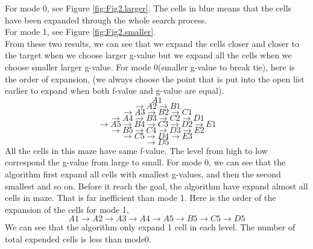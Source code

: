 \documentclass[11pt]{article}
\begin{document}
\newline 
For mode 0, see Figure \ref{fig:Fig2.larger}.
The cells in blue means that the cells have been expanded through the whole search process.\\ 
For mode 1, see Figure \ref{fig:Fig2.smaller}.\\
From these two results, we can see that we expand the cells closer and closer to the target when we choose larger g-value but we expand all the cells when we choose smaller larger g-value. 
\newline 
For mode 0(smaller g-value to break tie), here is the order of expansion,
\newline(we always choose the point that is put into the open list earlier to expand when both f-value and g-value are equal).
$$A1$$
$$\to A2\to B1$$
$$\to A3\to B2\to C1$$
$$\to A4\to B3\to C2\to D1$$
$$\to A5\to B4\to C3\to D2\to E1$$
$$\to B5\to C4\to D3\to E2$$
$$\to C5\to D4\to E3$$
$$\to D5$$
All the cells in this maze have same f-value. The level from high to low correspond the g-value from large to small.
\newline
For mode 0, we can see that the algorithm first expand all cells with smallest g-values, and then the second smallest and so on. Before it reach the goal, the algorithm have expand almost all cells in maze. That is far inefficient than mode 1. 
Here is the order of the expansion of the cells for mode 1,
$$A1\to A2\to A3\to A4\to A5\to B5\to C5\to D5$$
We can see that the algorithm only expand 1 cell in each level. The number of total expended cells is less than mode0.

\end{document}
